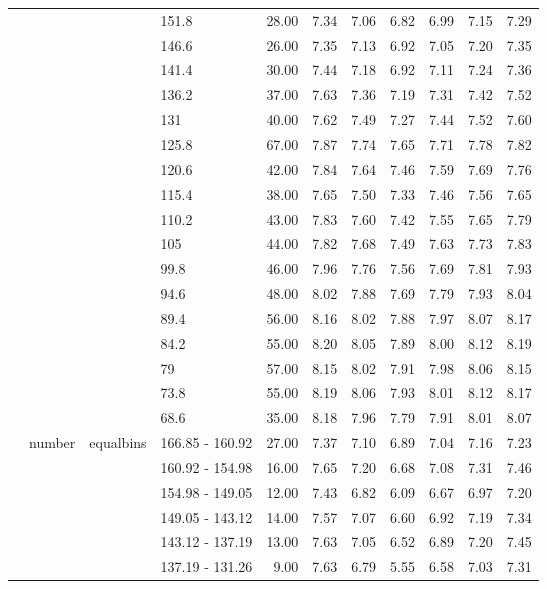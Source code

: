 \begin{longtable}{llllrrrrrrr}
   &  &  & 151.8 & 28.00 & 7.34 & 7.06 & 6.82 & 6.99 & 7.15 & 7.29 \\ 
   &  &  & 146.6 & 26.00 & 7.35 & 7.13 & 6.92 & 7.05 & 7.20 & 7.35 \\ 
   &  &  & 141.4 & 30.00 & 7.44 & 7.18 & 6.92 & 7.11 & 7.24 & 7.36 \\ 
   &  &  & 136.2 & 37.00 & 7.63 & 7.36 & 7.19 & 7.31 & 7.42 & 7.52 \\ 
   &  &  & 131 & 40.00 & 7.62 & 7.49 & 7.27 & 7.44 & 7.52 & 7.60 \\ 
   &  &  & 125.8 & 67.00 & 7.87 & 7.74 & 7.65 & 7.71 & 7.78 & 7.82 \\ 
   &  &  & 120.6 & 42.00 & 7.84 & 7.64 & 7.46 & 7.59 & 7.69 & 7.76 \\ 
   &  &  & 115.4 & 38.00 & 7.65 & 7.50 & 7.33 & 7.46 & 7.56 & 7.65 \\ 
   &  &  & 110.2 & 43.00 & 7.83 & 7.60 & 7.42 & 7.55 & 7.65 & 7.79 \\ 
   &  &  & 105 & 44.00 & 7.82 & 7.68 & 7.49 & 7.63 & 7.73 & 7.83 \\ 
   &  &  & 99.8 & 46.00 & 7.96 & 7.76 & 7.56 & 7.69 & 7.81 & 7.93 \\ 
   &  &  & 94.6 & 48.00 & 8.02 & 7.88 & 7.69 & 7.79 & 7.93 & 8.04 \\ 
   &  &  & 89.4 & 56.00 & 8.16 & 8.02 & 7.88 & 7.97 & 8.07 & 8.17 \\ 
   &  &  & 84.2 & 55.00 & 8.20 & 8.05 & 7.89 & 8.00 & 8.12 & 8.19 \\ 
   &  &  & 79 & 57.00 & 8.15 & 8.02 & 7.91 & 7.98 & 8.06 & 8.15 \\ 
   &  &  & 73.8 & 55.00 & 8.19 & 8.06 & 7.93 & 8.01 & 8.12 & 8.17 \\ 
   &  &  & 68.6 & 35.00 & 8.18 & 7.96 & 7.79 & 7.91 & 8.01 & 8.07 \\ 
   & number & equalbins & 166.85 - 160.92 & 27.00 & 7.37 & 7.10 & 6.89 & 7.04 & 7.16 & 7.23 \\ 
   &  &  & 160.92 - 154.98 & 16.00 & 7.65 & 7.20 & 6.68 & 7.08 & 7.31 & 7.46 \\ 
   &  &  & 154.98 - 149.05 & 12.00 & 7.43 & 6.82 & 6.09 & 6.67 & 6.97 & 7.20 \\ 
   &  &  & 149.05 - 143.12 & 14.00 & 7.57 & 7.07 & 6.60 & 6.92 & 7.19 & 7.34 \\ 
   &  &  & 143.12 - 137.19 & 13.00 & 7.63 & 7.05 & 6.52 & 6.89 & 7.20 & 7.45 \\ 
   &  &  & 137.19 - 131.26 & 9.00 & 7.63 & 6.79 & 5.55 & 6.58 & 7.03 & 7.31 \\ 

\end{longtable}
